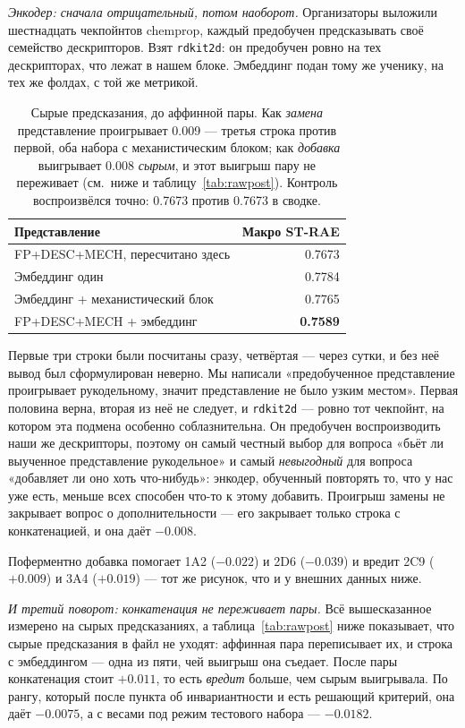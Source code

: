 \emph{Энкодер: сначала отрицательный, потом наоборот.} Организаторы выложили шестнадцать
чекпойнтов chemprop, каждый предобучен предсказывать своё семейство дескрипторов. Взят
\texttt{rdkit2d}: он предобучен ровно на тех дескрипторах, что лежат в нашем блоке.
Эмбеддинг подан тому же ученику, на тех же фолдах, с той же метрикой.

\begin{table}[htbp]\centering\small
\begin{tabularx}{0.8\textwidth}{@{}Xr@{}}
\toprule
Представление & Макро ST-RAE \\
\midrule
FP+DESC+MECH, пересчитано здесь & 0.7673 \\
Эмбеддинг один & 0.7784 \\
Эмбеддинг + механистический блок & 0.7765 \\
FP+DESC+MECH + эмбеддинг & \textbf{0.7589} \\
\bottomrule
\end{tabularx}
\caption{Сырые предсказания, до аффинной пары. Как \emph{замена} представление проигрывает
0.009 --- третья строка против первой, оба набора с механистическим блоком; как \emph{добавка}
выигрывает 0.008 \emph{сырым}, и этот выигрыш пару не переживает (см.\ ниже и
таблицу~\ref{tab:rawpost}). Контроль воспроизвёлся точно: 0.7673 против 0.7673 в сводке.}
\label{tab:emb}
\end{table}

Первые три строки были посчитаны сразу, четвёртая --- через сутки, и без неё вывод был
сформулирован неверно. Мы написали «предобученное представление проигрывает рукодельному,
значит представление не было узким местом». Первая половина верна, вторая из неё не следует,
и \texttt{rdkit2d} --- ровно тот чекпойнт, на котором эта подмена особенно соблазнительна.
Он предобучен воспроизводить наши же дескрипторы, поэтому он самый честный выбор для вопроса
«бьёт ли выученное представление рукодельное» и самый \emph{невыгодный} для вопроса «добавляет
ли оно хоть что-нибудь»: энкодер, обученный повторять то, что у нас уже есть, меньше всех
способен что-то к этому добавить. Проигрыш замены не закрывает вопрос о дополнительности ---
его закрывает только строка с конкатенацией, и она даёт $-0.008$.

Поферментно добавка помогает 1A2 ($-0.022$) и 2D6 ($-0.039$) и вредит 2C9 ($+0.009$)
и 3A4 ($+0.019$) --- тот же рисунок, что и у внешних данных ниже.

\emph{И третий поворот: конкатенация не переживает пары.} Всё вышесказанное измерено на сырых
предсказаниях, а таблица~\ref{tab:rawpost} ниже показывает, что сырые предсказания в файл не
уходят: аффинная пара переписывает их, и строка с эмбеддингом --- одна из пяти, чей выигрыш она
съедает. После пары конкатенация стоит $+0.011$, то есть \emph{вредит} больше, чем сырым
выигрывала. По рангу, который после пункта об инвариантности и есть решающий критерий, она даёт
$-0.0075$, а с весами под режим тестового набора --- $-0.0182$.

